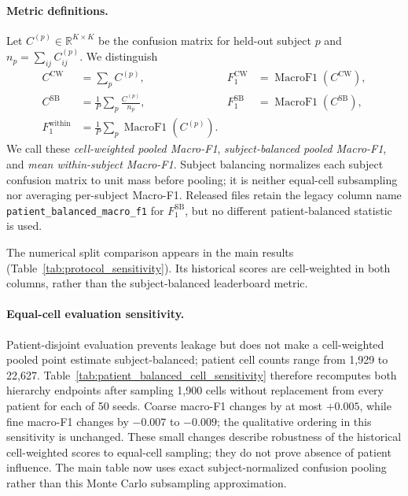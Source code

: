 \documentclass{article} %
\begin{document}
\paragraph{Metric definitions.}
Let $C^{(p)}\in\mathbb{R}^{K\times K}$ be the confusion matrix for held-out
subject $p$ and $n_p=\sum_{ij}C^{(p)}_{ij}$. We distinguish
\begin{align}
C^{\mathrm{CW}} &= \sum_p C^{(p)},
&F_1^{\mathrm{CW}} &= \operatorname{MacroF1}(C^{\mathrm{CW}}),\\
C^{\mathrm{SB}} &= \frac{1}{P}\sum_p\frac{C^{(p)}}{n_p},
&F_1^{\mathrm{SB}} &= \operatorname{MacroF1}(C^{\mathrm{SB}}),\\
F_1^{\mathrm{within}} &= \frac{1}{P}\sum_p
\operatorname{MacroF1}(C^{(p)}). &&
\end{align}
We call these \emph{cell-weighted pooled Macro-F1}, \emph{subject-balanced
pooled Macro-F1}, and \emph{mean within-subject Macro-F1}. Subject balancing
normalizes each subject confusion matrix to unit mass before pooling; it is
neither equal-cell subsampling nor averaging per-subject Macro-F1. Released
files retain the legacy column name \texttt{patient\_balanced\_macro\_f1} for
$F_1^{\mathrm{SB}}$, but no different patient-balanced statistic is used.

The numerical split comparison appears in the main results
(Table~\ref{tab:protocol_sensitivity}). Its historical scores are cell-weighted
in both columns, rather than the subject-balanced leaderboard metric.

\paragraph{Equal-cell evaluation sensitivity.}
Patient-disjoint evaluation prevents leakage but does not make a cell-weighted
pooled point estimate subject-balanced; patient cell counts range from
1{,}929 to 22{,}627. Table~\ref{tab:patient_balanced_cell_sensitivity} therefore
recomputes both hierarchy endpoints after sampling 1{,}900 cells without
replacement from every patient for each of 50 seeds. Coarse macro-F1 changes by
at most $+0.005$, while fine macro-F1 changes by $-0.007$ to $-0.009$; the
qualitative ordering in this sensitivity is unchanged. These small changes
describe robustness of the historical cell-weighted scores to equal-cell
sampling; they do not prove absence of patient influence. The main table now
uses exact subject-normalized confusion pooling rather than this Monte Carlo
subsampling approximation.


\end{document}
